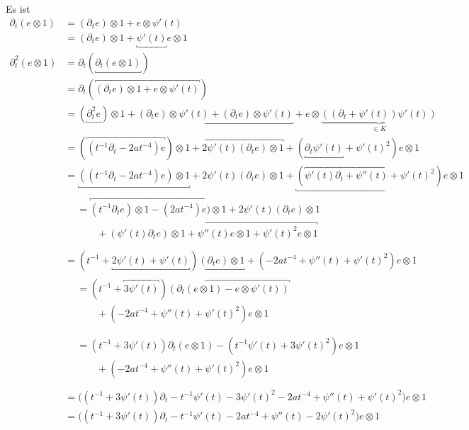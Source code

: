 Es ist
\begin{align*}
\partial_t(e\otimes 1) &= (\partial_te)\otimes 1 + e\otimes \psi'(t) \\
  &= (\partial_te)\otimes 1 + \underbracket{\psi'(t)} e\otimes 1 \\
\partial_t^2(e\otimes 1) &= \partial_t(\underbracket{\partial_t(e\otimes 1)})\\
  &= \partial_t(\overbracket{(\partial_te)\otimes 1
    + e\otimes \psi'(t)})\\
  &= (\underbracket{\partial_t^2 e})\otimes 1
    + \underbracket{(\partial_t e)\otimes \psi'(t)
    +               (\partial_t e)\otimes \psi'(t)}
    + e\otimes\underset{\in K}{\underbrace{((\partial_t+\psi'(t))\psi'(t))}}\\
  &= (\overbracket{(t^{-1}\partial_t - 2at^{-4}) e})\otimes 1
    + \overbracket{2\psi'(t) (\partial_t e)\otimes 1}
    + (\underbracket{\partial_t\psi'(t)} + \psi'(t)^2)e\otimes 1\\
  &= \underbracket{((t^{-1}\partial_t - 2at^{-4}) e)\otimes 1}
    + 2\psi'(t) (\partial_t e)\otimes 1
    + \underbracket{(\overbracket{\psi'(t)\partial_t + \psi''(t)} +
    \psi'(t)^2)e\otimes 1}\\
  &\begin{aligned}
    &= \overbracket{
        (t^{-1}\partial_t e)\otimes 1
        - (2at^{-4}) e)\otimes 1
      }
      + 2\psi'(t) (\partial_t e)\otimes 1\\
    &\qquad + \overbracket{
        (\psi'(t)\partial_t e)\otimes 1
        + \psi''(t) e\otimes 1
        + \psi'(t)^2 e\otimes 1
      }\\
  \end{aligned} \\
  &= (t^{-1} + \underbracket{2\psi'(t) + \psi'(t)})
    \underbracket{(\partial_t e)\otimes 1}
    + (- 2at^{-4} + \psi''(t) + \psi'(t)^2) e\otimes 1 \\
  &\begin{aligned}
    &= (t^{-1} + \overbracket{3\psi'(t)})\overbracket{(\partial_t (e\otimes 1)
    - e\otimes \psi'(t))}\\
    &\qquad + (- 2at^{-4} + \psi''(t) + \psi'(t)^2) e\otimes 1 \\
  \end{aligned} \\
  &\begin{aligned}
    &= (t^{-1} + 3\psi'(t))\partial_t (e\otimes 1)
    - (t^{-1} \psi'(t) + 3\psi'(t)^2)e\otimes 1\\
    &\qquad + (- 2at^{-4} + \psi''(t) + \psi'(t)^2) e\otimes 1 \\
  \end{aligned} \\
  &= \Big((t^{-1} + 3\psi'(t))\partial_t
    - t^{-1} \psi'(t) - 3\psi'(t)^2 - 2at^{-4} + \psi''(t)
    + \psi'(t)^2\Big) e\otimes 1 \\
  &= \Big((t^{-1} + 3\psi'(t))\partial_t
    - t^{-1} \psi'(t) - 2at^{-4} + \psi''(t)
    - 2 \psi'(t)^2\Big) e\otimes 1
\end{align*}

